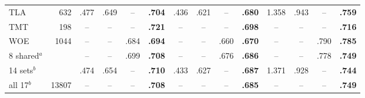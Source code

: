 \begin{tabular}{lr cccc cccc cccc}
TLA & 632 & .477 & .649 & -- & \textbf{.704} & .436 & .621 & -- & \textbf{.680} & 1.358 & .943 & -- & \textbf{.759} \\
TMT & 198 & -- & -- & -- & \textbf{.721} & -- & -- & -- & \textbf{.698} & -- & -- & -- & \textbf{.716} \\
WOE & 1044 & -- & -- & .684 & \textbf{.694} & -- & -- & .660 & \textbf{.670} & -- & -- & .790 & \textbf{.785} \\
\midrule
8 shared$^a$ &  & -- & -- & .699 & \textbf{.708} & -- & -- & .676 & \textbf{.686} & -- & -- & .778 & \textbf{.749} \\
14 sets$^b$ &  & .474 & .654 & -- & \textbf{.710} & .433 & .627 & -- & \textbf{.687} & 1.371 & .928 & -- & \textbf{.744} \\
all 17$^b$ & 13807 & -- & -- & -- & \textbf{.708} & -- & -- & -- & \textbf{.685} & -- & -- & -- & \textbf{.749} \\
\bottomrule
\end{tabular}

